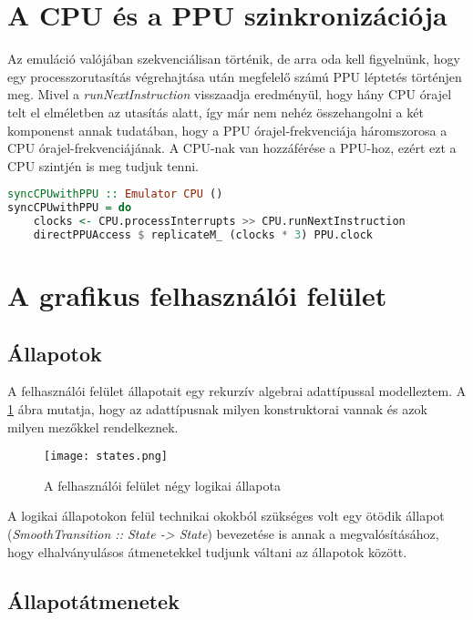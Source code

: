 \section{A CPU és a PPU szinkronizációja}
Az emuláció valójában szekvenciálisan történik, de arra oda kell figyelnünk, hogy egy processzorutasítás végrehajtása után megfelelő számú PPU léptetés történjen meg. Mivel a \emph{runNextInstruction} visszaadja eredményül, hogy hány CPU órajel telt el elméletben az utasítás alatt, így már nem nehéz összehangolni a két komponenst annak tudatában, hogy a PPU órajel-frekvenciája háromszorosa a CPU órajel-frekvenciájának.
A CPU-nak van hozzáférése a PPU-hoz, ezért ezt a CPU szintjén is meg tudjuk tenni.
\vspace{0.3cm}
\begin{lstlisting}[language=Haskell, basicstyle=\scriptsize]
syncCPUwithPPU :: Emulator CPU ()
syncCPUwithPPU = do
	clocks <- CPU.processInterrupts >> CPU.runNextInstruction
	directPPUAccess $ replicateM_ (clocks * 3) PPU.clock
\end{lstlisting}

\section{A grafikus felhasználói felület}
\label{lab:gui}

\subsection{Állapotok}

A felhasználói felület állapotait egy rekurzív algebrai adattípussal modelleztem. A \ref{fig:guistate} ábra mutatja, hogy az adattípusnak milyen konstruktorai vannak és azok milyen mezőkkel rendelkeznek.

\begin{figure}[H]
	\centering
	\texttt{[image: states.png]}
	\caption{A felhasználói felület négy logikai állapota}
	\label{fig:guistate}
\end{figure}

A logikai állapotokon felül technikai okokból szükséges volt egy ötödik állapot (\emph{SmoothTransition :: State -> State}) bevezetése is annak a megvalósításához, hogy elhalványulásos átmenetekkel tudjunk váltani az állapotok között.

\subsection{Állapotátmenetek}

